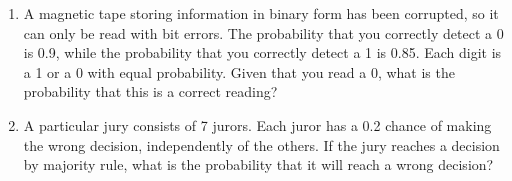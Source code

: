 \documentclass[12pt, oneside]{article}
\begin{document}
\begin{enumerate}
\newpage
\item A magnetic tape storing information in binary form has been corrupted, so it can only be read with bit errors. The probability that you correctly detect a 0 is 0.9, while the probability that you correctly detect a 1 is 0.85. Each digit is a 1 or a 0 with equal probability. Given that you read a 0, what is the probability that this is a correct reading?

\newpage
\item A particular jury consists of 7 jurors. Each juror has a 0.2 chance of making the wrong decision, independently of the others. If the jury reaches a decision by majority rule, what is the probability that it will reach a wrong decision?

\end{enumerate}
\end{document}
